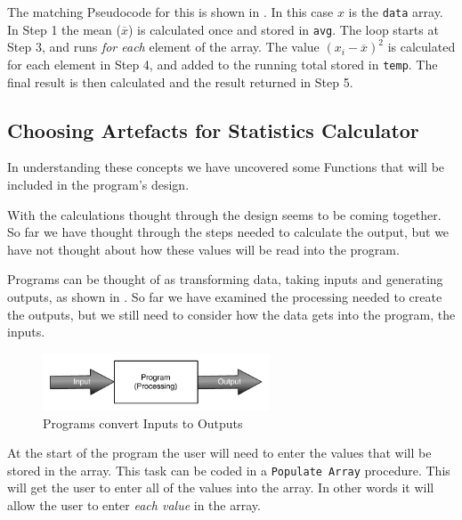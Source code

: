 The matching Pseudocode for this is shown in . In this case $x$ is the \texttt{data} array. In Step 1 the mean ($\overline{x}$) is calculated once and stored in \texttt{avg}. The loop starts at Step 3, and runs \emph{for each} element of the array. The value $(x_{i} - \overline{x})^2$ is calculated for each element in Step 4, and added to the running total stored in \texttt{temp}. The final result is then calculated and the result returned in Step 5.




\clearpage
\subsection{Choosing Artefacts for Statistics Calculator} %
\label{sub:choosing_artefacts_for_statistics_calculator}

In understanding these concepts we have uncovered some Functions that will be included in the program's design. 

With the calculations thought through the design seems to be coming together. So far we have thought through the steps needed to calculate the output, but we have not thought about how these values will be read into the program.

Programs can be thought of as transforming data, taking inputs and generating outputs, as shown in . So far we have examined the processing needed to create the outputs, but we still need to consider how the data gets into the program, the inputs.

\begin{figure}[h]
   \centering
   \includegraphics[width=0.6\textwidth]{./topics/arrays/diagrams/ProcessingOverview} 
   \caption{Programs convert Inputs to Outputs}
   \label{fig:input-output-overview}
\end{figure}

At the start of the program the user will need to enter the values that will be stored in the array. This task can be coded in a \texttt{Populate Array} procedure. This will get the user to enter all of the values into the array. In other words it will allow the user to enter \emph{each value} in the array.

